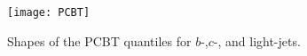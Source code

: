 \begin{figure}[ht]
  \centering
  \texttt{[image: PCBT]}
  \caption[Shapes of the pseudo-continuous b-tagging quantiles for different jet
  flavours.]{Shapes of the PCBT quantiles for $b$-,$c$-, and light-jets.}
  \label{fig:PCBT_quant}
\end{figure}